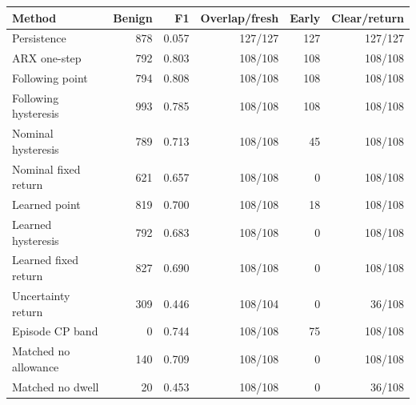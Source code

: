 \begin{tabular}{lrrrrr}\toprule
Method & Benign & F1 & Overlap/fresh & Early & Clear/return \\\midrule
Persistence & 878 & 0.057 & 127/127 & 127 & 127/127 \\
ARX one-step & 792 & 0.803 & 108/108 & 108 & 108/108 \\
Following point & 794 & 0.808 & 108/108 & 108 & 108/108 \\
Following hysteresis & 993 & 0.785 & 108/108 & 108 & 108/108 \\
Nominal hysteresis & 789 & 0.713 & 108/108 & 45 & 108/108 \\
Nominal fixed return & 621 & 0.657 & 108/108 & 0 & 108/108 \\
Learned point & 819 & 0.700 & 108/108 & 18 & 108/108 \\
Learned hysteresis & 792 & 0.683 & 108/108 & 0 & 108/108 \\
Learned fixed return & 827 & 0.690 & 108/108 & 0 & 108/108 \\
Uncertainty return & 309 & 0.446 & 108/104 & 0 & 36/108 \\
Episode CP band & 0 & 0.744 & 108/108 & 75 & 108/108 \\
Matched no allowance & 140 & 0.709 & 108/108 & 0 & 108/108 \\
Matched no dwell & 20 & 0.453 & 108/108 & 0 & 36/108 \\
\bottomrule\end{tabular}
